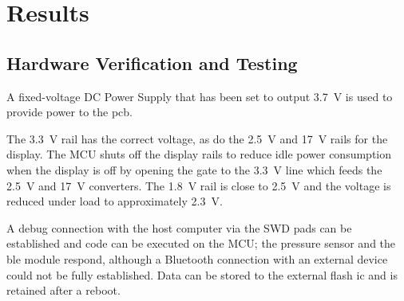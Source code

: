 
\chapter{Results}\label{chapter:results}

\section{Hardware Verification and Testing}
A fixed-voltage DC Power Supply that has been set to output \SI{3.7}{\volt} is used to provide power to the \gls{pcb}.

The \SI{3.3}{\volt} rail has the correct voltage, as do the \SI{2.5}{\volt} and \SI{17}{\volt} rails for the display.
The MCU shuts off the display rails to reduce idle power consumption when the display is off by opening the gate to the \SI{3.3}{\volt} line which feeds the \SI{2.5}{\volt} and \SI{17}{\volt} converters.
The \SI{1.8}{\volt} rail is close to \SI{2.5}{\volt} and the voltage is reduced under load to approximately \SI{2.3}{\volt}.

A debug connection with the host computer via the SWD pads can be established and code can be executed on the MCU; the pressure sensor and the \gls{ble} module respond, although a Bluetooth connection with an external device could not be fully established.
Data can be stored to the external flash \gls{ic} and is retained after a reboot.

